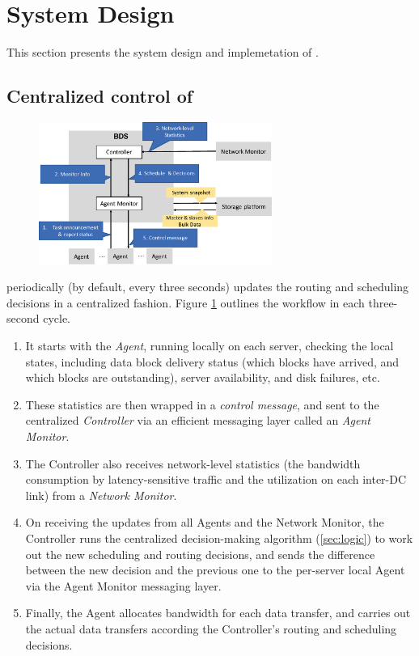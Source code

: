 \section{System Design}
\label{sec:system}

This section presents the system design and implemetation of
\name.

\subsection{Centralized control of \name}
\label{subsec:system:centralized}

\begin{figure}[t]
  \centering
  \includegraphics[width=3in]{images/implementation_v4.eps}
  \label{fig:implementation}
\vspace{-0.4cm}
\end{figure}

\name periodically (by default, every three seconds) updates the
routing and scheduling decisions in a centralized fashion.
Figure \ref{fig:implementation} outlines the workflow in each
three-second cycle.
\begin{enumerate}
\item It starts with the {\em Agent}, running locally on each server,
checking the local states, including data block delivery status
(which blocks have arrived, and which blocks are outstanding),
server availability, and disk failures, etc.
\item These statistics are then wrapped in a {\em control message},
and sent to the centralized {\em \name Controller} via an efficient
messaging layer called an {\em Agent Monitor}.
\item The \name Controller also receives network-level statistics
(the bandwidth consumption by latency-sensitive traffic and the
utilization on each inter-DC link) from a {\em Network Monitor}.
\item On receiving the updates from all Agents and the Network
Monitor, the \name Controller runs the centralized decision-making
algorithm (\Section\ref{sec:logic}) to work out the new scheduling
and routing decisions, and sends the difference between the new
decision and the previous one to the per-server local Agent via
the Agent Monitor messaging layer.
\item Finally, the Agent allocates bandwidth for each data transfer,
and carries out the actual data transfers according the Controller's
routing and scheduling decisions.
\end{enumerate}


